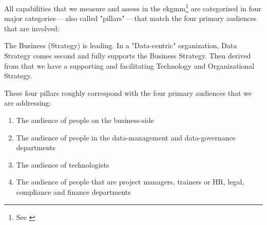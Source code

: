 %
%
\label{sec:the-four-capability-domains}
All capabilities that we measure and assess in the \gls{ekgmm}\footnote{See \autocite{ekgmm}} are categorized
in four major categories\,---\,also called "pillars"\,---\,that match the four primary audiences that are involved:

The Business (Strategy) is leading.
In a "Data-centric" organization, Data Strategy comes second and
fully supports the Business Strategy.
Then derived from that we have a supporting and facilitating Technology and Organizational Strategy.

These four pillars roughly correspond with the four primary audiences that we are addressing:

\begin{enumerate}
    \item The audience of people on the business-side
    \item The audience of people in the data-management and data-governance departments
    \item The audience of technologists
    \item The audience of people that are project managers, trainers or HR, legal, compliance and finance departments
\end{enumerate}
